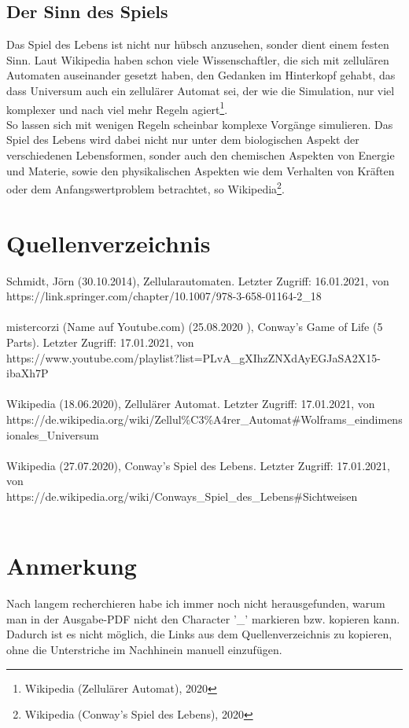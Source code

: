 \documentclass[12pt]{article}
\begin{document}
\subsection{Der Sinn des Spiels}
	Das Spiel des Lebens ist nicht nur hübsch anzusehen, sonder dient einem festen Sinn. Laut Wikipedia haben schon viele Wissenschaftler, die sich mit zellulären Automaten auseinander gesetzt haben, den Gedanken im Hinterkopf gehabt, das dass Universum auch ein zellulärer Automat sei, der wie die Simulation, nur viel komplexer und nach viel mehr Regeln agiert\footnote{Wikipedia (Zellulärer Automat), 2020}.\\
	So lassen sich mit wenigen Regeln scheinbar komplexe Vorgänge simulieren. Das Spiel des Lebens wird dabei nicht nur unter dem biologischen Aspekt der verschiedenen Lebensformen, sonder auch den chemischen Aspekten von Energie und Materie, sowie den physikalischen Aspekten wie dem Verhalten von Kräften oder dem Anfangswertproblem betrachtet, so Wikipedia\footnote{Wikipedia (Conway's Spiel des Lebens), 2020}.
	




\newpage

\section{Quellenverzeichnis}
	Schmidt, Jörn (30.10.2014), Zellularautomaten. Letzter Zugriff: 16.01.2021, von \\https://link.springer.com/chapter/10.1007/978-3-658-01164-2\_18
	\\\\
	mistercorzi (Name auf Youtube.com) (25.08.2020 ), Conway's Game of Life (5 Parts). Letzter Zugriff: 17.01.2021, von
	\\https://www.youtube.com/playlist?list=PLvA\_gXIhzZNXdAyEGJaSA2X15-ibaXh7P
	\\\\
	Wikipedia (18.06.2020), Zellulärer Automat. Letzter Zugriff: 17.01.2021, von
	\\https://de.wikipedia.org/wiki/Zellul\%C3\%A4rer\_Automat\#Wolframs\_eindimensionales\_Universum
	\\\\
	Wikipedia (27.07.2020), Conway's Spiel des Lebens. Letzter Zugriff: 17.01.2021, von
	\\https://de.wikipedia.org/wiki/Conways\_Spiel\_des\_Lebens\#Sichtweisen
	\\\\

\newpage

\section{Anmerkung}
	Nach langem recherchieren habe ich immer noch nicht herausgefunden, warum man in der Ausgabe-PDF nicht den Character '\_' markieren bzw. kopieren kann. Dadurch ist es nicht möglich, die Links aus dem Quellenverzeichnis zu kopieren, ohne die Unterstriche im Nachhinein manuell einzufügen.
\end{document}
